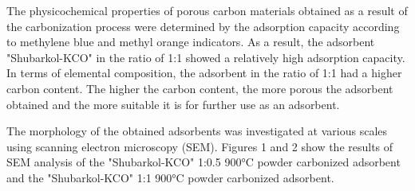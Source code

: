 
The physicochemical properties of porous carbon materials obtained as a
result of the carbonization process were determined by the adsorption
capacity according to methylene blue and methyl orange indicators. As a
result, the adsorbent "Shubarkol-KCO"
in the ratio of 1:1 showed a relatively high adsorption capacity. In
terms of elemental composition, the adsorbent in the ratio of 1:1 had a
higher carbon content. The higher the carbon content, the more porous
the adsorbent obtained and the more suitable it is for further use as an
adsorbent.

The morphology of the obtained adsorbents was investigated at various
scales using scanning electron microscopy (SEM). Figures 1 and 2 show
the results of SEM analysis of the
"Shubarkol-KCO" 1:0.5 900°C powder
carbonized adsorbent and the
"Shubarkol-KCO" 1:1 900°C powder
carbonized adsorbent.



